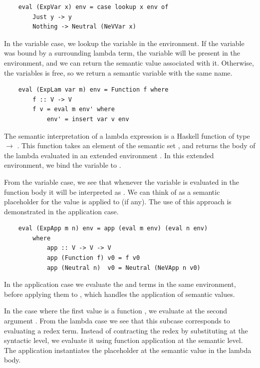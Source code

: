 \begin{lstlisting}
    eval (ExpVar x) env = case lookup x env of
        Just y -> y
        Nothing -> Neutral (NeVVar x)
\end{lstlisting}

In the variable case, we lookup the variable in the environment. If the variable was bound by a surrounding lambda term, the variable will be present in the environment, and we can return the semantic value associated with it. Otherwise, the variables is free, so we return a semantic variable with the same name.

\begin{lstlisting}
    eval (ExpLam var m) env = Function f where
        f :: V -> V
        f v = eval m env' where
            env' = insert var v env
\end{lstlisting}

The semantic interpretation of a lambda expression is a Haskell function of type  $\rightarrow$ . This function takes an element  of the semantic set , and returns the body of the lambda evaluated in an extended environment . In this extended environment, we bind the variable  to .

From the variable case, we see that whenever the variable  is evaluated in the function body it will be interpreted as . We can think of  as a semantic placeholder for the value  is applied to (if any). The use of this approach is demonstrated in the application case.

\begin{lstlisting}
    eval (ExpApp m n) env = app (eval m env) (eval n env)
        where
            app :: V -> V -> V
            app (Function f) v0 = f v0
            app (Neutral n)  v0 = Neutral (NeVApp n v0)
\end{lstlisting}

In the application case we evaluate the  and  terms in the same environment, before applying them to , which handles the application of semantic values. 

In the case where the first value is a function , we evaluate  at the second argument . From the lambda case we see that this subcase corresponds to evaluating a redex term. Instead of contracting the redex by substituting at the syntactic level, we evaluate it using function application at the semantic level. The application instantiates the placeholder  at the semantic value  in the lambda body. 

